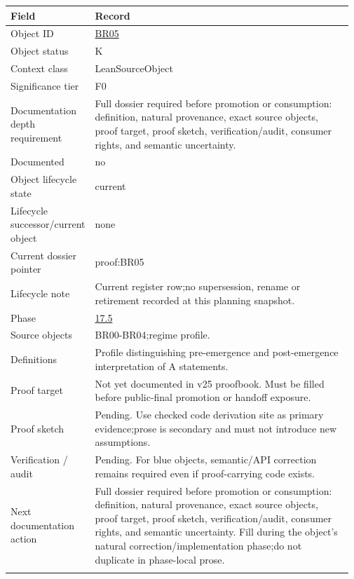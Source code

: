 \begin{longtable}{L{0.16\linewidth} L{0.81\linewidth}}
\hline
\textbf{Field} & \textbf{Record}\\
\hline
Object ID & \hyperlink{object-row-BR05}{BR05}\\
\hline\addlinespace[0.20em]
Object status & K\\
\hline\addlinespace[0.20em]
Context class & LeanSourceObject\\
\hline\addlinespace[0.20em]
Significance tier & F0\\
\hline\addlinespace[0.20em]
Documentation depth requirement & Full dossier required before promotion or consumption: definition, natural provenance, exact source objects, proof target, proof sketch, verification/\allowbreak{}audit, consumer rights, and semantic uncertainty.\\
\hline\addlinespace[0.20em]
Documented & no\\
\hline\addlinespace[0.20em]
Object lifecycle state & current\\
\hline\addlinespace[0.20em]
Lifecycle successor/\allowbreak{}current object & none\\
\hline\addlinespace[0.20em]
Current dossier pointer & proof:BR05\\
\hline\addlinespace[0.20em]
Lifecycle note & Current register row;\newline no supersession, rename or retirement recorded at this planning snapshot.\\
\hline\addlinespace[0.20em]
Phase & \hyperlink{phase-row-17-5}{17.5}\\
\hline\addlinespace[0.20em]
Source objects & BR00-BR04;\newline regime profile.\\
\hline\addlinespace[0.20em]
Definitions & Profile distinguishing pre-emergence and post-emergence interpretation of A statements.\\
\hline\addlinespace[0.20em]
Proof target & Not yet documented in v25 proofbook. Must be filled before public-final promotion or handoff exposure.\\
\hline\addlinespace[0.20em]
Proof sketch & Pending. Use checked code derivation site as primary evidence;\newline prose is secondary and must not introduce new assumptions.\\
\hline\addlinespace[0.20em]
Verification /\allowbreak{} audit & Pending. For blue objects, semantic/\allowbreak{}API correction remains required even if proof-carrying code exists.\\
\hline\addlinespace[0.20em]
Next documentation action & Full dossier required before promotion or consumption: definition, natural provenance, exact source objects, proof target, proof sketch, verification/\allowbreak{}audit, consumer rights, and semantic uncertainty. Fill during the object's natural correction/\allowbreak{}implementation phase;\newline do not duplicate in phase-local prose.\\
\hline\addlinespace[0.20em]
\end{longtable}
